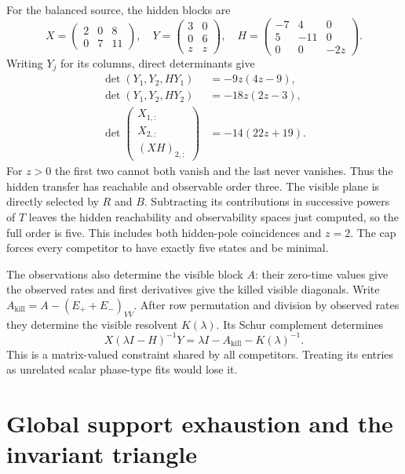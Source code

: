 For the balanced source, the hidden blocks are
\begin{equation}
 X=\begin{pmatrix}2&0&8\\0&7&11\end{pmatrix},\quad
 Y=\begin{pmatrix}3&0\\0&6\\z&z\end{pmatrix},\quad
 H=\begin{pmatrix}-7&4&0\\5&-11&0\\0&0&-2z\end{pmatrix}.\label{eq:blocks}
\end{equation}
Writing $Y_j$ for its columns, direct determinants give
\begin{align}
 \det(Y_1,Y_2,HY_1)&=-9z(4z-9),\\
 \det(Y_1,Y_2,HY_2)&=-18z(2z-3),\\
 \det\begin{pmatrix}X_{1,:}\\X_{2,:}\\(XH)_{2,:}\end{pmatrix}&=-14(22z+19).
\end{align}
For $z>0$ the first two cannot both vanish and the last never vanishes. Thus the hidden transfer has reachable and observable order three. The visible plane is directly selected by $R$ and $B$. Subtracting its contributions in successive powers of $T$ leaves the hidden reachability and observability spaces just computed, so the full order is five. This includes both hidden-pole coincidences and $z=2$. The cap forces every competitor to have exactly five states and be minimal.

The observations also determine the visible block $A$: their zero-time values give the observed rates and first derivatives give the killed visible diagonals. Write $A_{\mathrm{kill}}=A-(E_++E_-)_{VV}$. After row permutation and division by observed rates they determine the visible resolvent $K(\lambda)$. Its Schur complement determines
\begin{equation}
 X(\lambda I-H)^{-1}Y=\lambda I-A_{\mathrm{kill}}-K(\lambda)^{-1}.\label{eq:htransfer}
\end{equation}
This is a matrix-valued constraint shared by all competitors. Treating its entries as unrelated scalar phase-type fits would lose it.

\section{Global support exhaustion and the invariant triangle}\label{app:cone}
